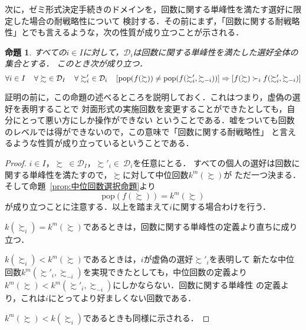 \documentclass[dvipdfmx]{jsarticle}
\newtheorem{proposition}[definition]{命題}
\begin{document}
  次に，ゼミ形式決定手続きのドメインを，回数に関する単峰性を満たす選好に限定した場合の耐戦略性について
  検討する．その前にまず，「回数に関する耐戦略性」とでも言えるような，次の性質が成り立つことが示される．

  \begin{proposition}
    すべての$i \in I$に対して，$\mathcal{D}_i$は回数に関する単峰性を満たした選好全体の集合とする．
    このとき次が成り立つ．
    \begin{equation*}
      \forall i \in I \hspace{4mm} \forall \succsim \ \in \mathcal{D}_I \hspace{4mm}
      \forall \succsim'_i \ \in \mathcal{D}_i \hspace{4mm}
      [\mathrm{pop}(f(\succsim)) \neq \mathrm{pop}(f(\succsim'_i, \succsim_{-i}))]
      \Rightarrow [f(\succsim) \succ_i f(\succsim'_i, \succsim_{-i})]
    \end{equation*}
  \end{proposition}

  証明の前に，この命題の述べるところを説明しておく．これはつまり，虚偽の選好を表明することで
  対面形式の実施回数を変更することができたとしても，自分にとって悪い方にしか操作ができない
  ということである．嘘をついても回数のレベルでは得ができないので，この意味で「回数に関する耐戦略性」
  と言えるような性質が成り立っているということである．

  \begin{proof}
    $i \in I$，$\succsim \ \in \mathcal{D}_I$，$\succsim'_i \in \ \mathcal{D}_i$を任意にとる．
    すべての個人の選好は回数に関する単峰性を満たすので，$\succsim$に対して中位回数$k^m(\succsim)$が
    ただ一つ決まる．そして命題~\ref{prop:中位回数選択命題}より
    \begin{equation*}
      \mathrm{pop}(f(\succsim)) = k^m(\succsim)
    \end{equation*}
    が成り立つことに注意する．以上を踏まえて$i$に関する場合わけを行う．

    $k(\succsim_i) = k^m(\succsim)$であるときは，回数に関する単峰性の定義より直ちに成り立つ．

    $k(\succsim_i) < k^m(\succsim)$であるときは，$i$が虚偽の選好$\succsim'_i$を表明して
    新たな中位回数$k^m(\succsim'_i, \succsim_{-i})$を実現できたとしても，中位回数の定義より
    $k^m(\succsim) < k^m(\succsim'_i, \succsim_{-i})$にしかならない．回数に関する単峰性
    の定義より，これは$i$にとってより好ましくない回数である．

    $k^m(\succsim) < k(\succsim_i)$であるときも同様に示される．
  \end{proof}
\end{document}
